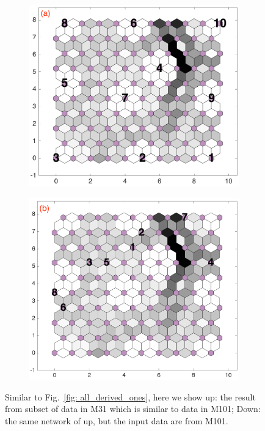 \begin{figure}
 \begin{subfigure}[b]{0.5\textwidth}
        \centering
        \includegraphics[width=\textwidth]{../../images0.01/M31/2D/image_subsets/subset9_dist_with_hits_t.png}
    \end{subfigure}
    \hfill
    \begin{subfigure}[b]{0.5\textwidth}
    \includegraphics[width=\textwidth]{../../images0.01/M31/2D/image_subsets/subset9_dist_with_hits_v.png}
    \end{subfigure}
    \caption{Similar to Fig.~\ref{fig: all_derived_ones}, here we show up: the result from subset of data in M31 which is similar to data in M101; Down: the same network of up, but the input data are from M101.}
    \label{fig: subset9}
\end{figure}
